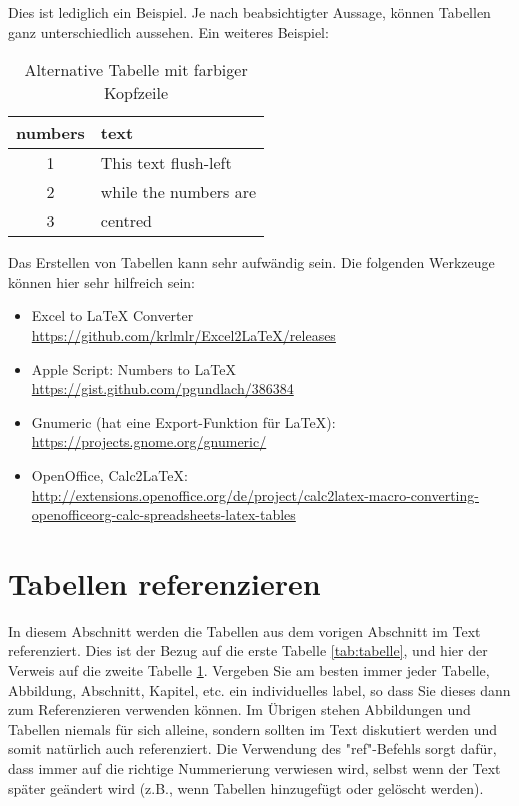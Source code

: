 \noindent{}Dies ist lediglich ein Beispiel. Je nach beabsichtigter Aussage, können Tabellen ganz unterschiedlich aussehen. Ein weiteres Beispiel:

\begin{table}[ht]
    \vspace{0.5em}
	\centering
	\begin{tabular}{|c|l|}
		\hline
		\rowcolor[gray]{0.9}\textbf{numbers} & \textbf{text} \\
		\hline
		\hline
		1 & This text flush-left \\
		\hline
		2 & while the numbers are \\
		\hline
		3 & centred \\
		\hline
	\end{tabular}
	\caption[Alternative Tabelle]{Alternative Tabelle mit farbiger Kopfzeile}
	\label{tab:tablealternative}
	\vspace{0.5em}
\end{table}


Das Erstellen von Tabellen kann sehr aufwändig sein. Die folgenden Werkzeuge können hier sehr hilfreich sein:

\begin{itemize}
	\item Excel to \LaTeX{} Converter\\ \url{https://github.com/krlmlr/Excel2LaTeX/releases}
	\item Apple Script: Numbers to \LaTeX{} \\ \url{https://gist.github.com/pgundlach/386384}
	\item Gnumeric (hat eine Export-Funktion für \LaTeX{}): \\ \url{https://projects.gnome.org/gnumeric/}
	\item OpenOffice, Calc2LaTeX: \url{http://extensions.openoffice.org/de/project/calc2latex-macro-converting-openofficeorg-calc-spreadsheets-latex-tables}
\end{itemize}

\section{Tabellen referenzieren}
\label{sec:tabellen_ref}
In diesem Abschnitt werden die Tabellen aus dem vorigen Abschnitt im Text referenziert. Dies ist der Bezug auf die erste Tabelle \ref{tab:tabelle}, und hier der Verweis auf die zweite Tabelle \ref{tab:tablealternative}. Vergeben Sie am besten immer jeder Tabelle, Abbildung, Abschnitt, Kapitel, etc. ein individuelles label, so dass Sie dieses dann zum Referenzieren verwenden können. Im Übrigen stehen Abbildungen und Tabellen niemals für sich alleine, sondern sollten im Text diskutiert werden und somit natürlich auch referenziert. Die Verwendung des "ref{}"-Befehls sorgt dafür, dass immer auf die richtige Nummerierung verwiesen wird, selbst wenn der Text später geändert wird (z.B., wenn Tabellen hinzugefügt oder gelöscht werden). 

